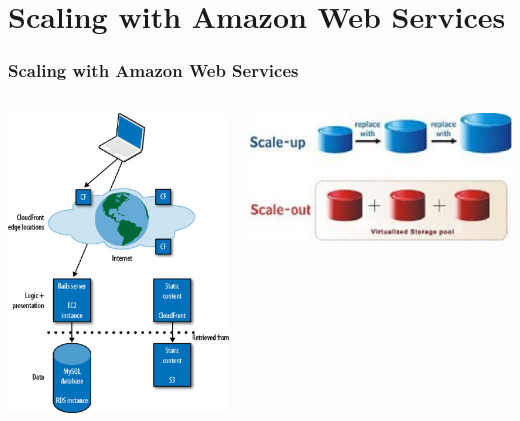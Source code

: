 \documentclass{beamer}
\begin{document}
\section{Scaling with Amazon Web Services}
\begin{frame}
\frametitle{Scaling with Amazon Web Services}

\begin{columns}

\begin{center}
\includegraphics[scale=0.20]{Programming_Amazon_EC2-013.eps}      
\end{center}
\begin{center}
\includegraphics[scale=0.45]{scale.eps}
\end{center}
\end{columns}


\end{frame}
\end{document}
